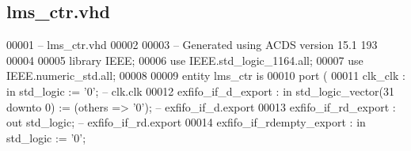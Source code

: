 \subsection{lms\+\_\+ctr.\+vhd}
\label{lms__ctr_8vhd_source}

\begin{DoxyCode}
00001 \textcolor{keyword}{-- lms\_ctr.vhd}
00002 
00003 \textcolor{keyword}{-- Generated using ACDS version 15.1 193}
00004 
00005 \textcolor{vhdlkeyword}{library }\textcolor{keywordflow}{IEEE};
00006 \textcolor{vhdlkeyword}{use }IEEE.std\_logic\_1164.\textcolor{keywordflow}{all};
00007 \textcolor{vhdlkeyword}{use }IEEE.numeric\_std.\textcolor{keywordflow}{all};
00008 
00009 \textcolor{keywordflow}{entity }lms_ctr \textcolor{keywordflow}{is}
00010     \textcolor{keywordflow}{port} \textcolor{vhdlchar}{(}
00011         \textcolor{vhdlchar}{clk_clk}                                 \textcolor{vhdlchar}{:} \textcolor{keywordflow}{in}    \textcolor{comment}{std\_logic}                     \textcolor{vhdlchar}{:=} \textcolor{vhdlchar}{'}\textcolor{vhdllogic}{}\textcolor{vhdllogic}{0}\textcolor{vhdlchar}{'};\textcolor{keyword}{            
       --                              clk.clk}
00012         \textcolor{vhdlchar}{exfifo_if_d_export}                      \textcolor{vhdlchar}{:} \textcolor{keywordflow}{in}    \textcolor{comment}{std\_logic\_vector}\textcolor{vhdlchar}{(}\textcolor{vhdllogic}{}\textcolor{vhdllogic}{31} \textcolor{keywordflow}{downto} \textcolor{vhdllogic}{}\textcolor{vhdllogic}{0}\textcolor{vhdlchar}{)} \textcolor{vhdlchar}{:=} \textcolor{vhdlchar}{(}\textcolor{keywordflow}{others} \textcolor{vhdlchar}{=}\textcolor{vhdlchar}{>} \textcolor{vhdlchar}{'}\textcolor{vhdllogic}{}\textcolor{vhdllogic}{0}\textcolor{vhdlchar}{'}\textcolor{vhdlchar}{)};\textcolor{keyword}{
       --                      exfifo\_if\_d.export}
00013         \textcolor{vhdlchar}{exfifo_if_rd_export}                     \textcolor{vhdlchar}{:} \textcolor{keywordflow}{out}   \textcolor{comment}{std\_logic};\textcolor{keyword}{                                       
       --                     exfifo\_if\_rd.export}
00014         \textcolor{vhdlchar}{exfifo_if_rdempty_export}                \textcolor{vhdlchar}{:} \textcolor{keywordflow}{in}    \textcolor{comment}{std\_logic}                     \textcolor{vhdlchar}{:=} \textcolor{vhdlchar}{'}\textcolor{vhdllogic}{}\textcolor{vhdllogic}{0}\textcolor{vhdlchar}{'};\textcolor{keyword}{            
}
\end{DoxyCode}
